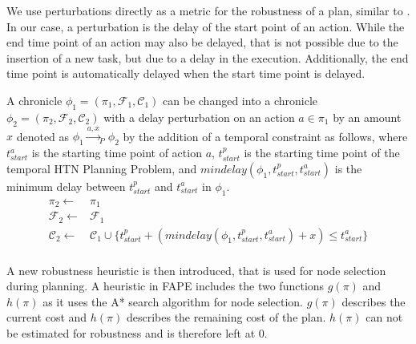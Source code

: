 We use perturbations directly as a metric for the robustness of a plan, similar to \cite{wehnerRobustVsFast2023}.
In our case, a perturbation is the delay of the start point of an action.
While the end time point of an action may also be delayed, that is not possible due to the insertion of a new task, but due to a delay in the execution.
Additionally, the end time point is automatically delayed when the start time point is delayed.

\begin{definition}
    A chronicle $\phi_1 = (\pi_1,\mathcal{F}_1,\mathcal{C}_1)$ can be changed into a chronicle $\phi_2 = (\pi_2,\mathcal{F}_2,\mathcal{C}_2)$ with a delay perturbation on an action $a \in \pi_1$ by an amount $x$ denoted as $\phi_1 \xrightarrow{a,x}_P \phi_2$ by the addition of a temporal constraint as follows, where $t^a_{start}$ is the starting time point of action $a$, $t^p_{start}$ is the starting time point of the temporal HTN Planning Problem, and $mindelay(\phi_1,t^p_{start},t^a_{start})$ is the minimum delay between $t^p_{start}$ and $t^a_{start}$ in $\phi_1$.
    \begin{align*}
        \pi_2 \leftarrow & \pi_1 \\
        \mathcal{F}_2 \leftarrow & \mathcal{F}_1 \\
        \mathcal{C}_2 \leftarrow & \mathcal{C}_1 \cup \{t^p_{start} + (mindelay(\phi_1,t^p_{start},t^a_{start}) + x) \leq t^a_{start}\} \\
    \end{align*}
\end{definition}



A new robustness heuristic is then introduced, that is used for node selection during planning.
A heuristic in \ac{FAPE} includes the two functions $g(\pi)$ and $h(\pi)$ as it uses the A* search algorithm for node selection.
$g(\pi)$ describes the current cost and $h(\pi)$ describes the remaining cost of the plan.
$h(\pi)$ can not be estimated for robustness and is therefore left at 0.

